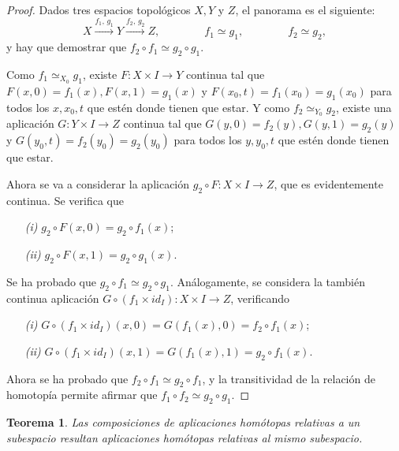 \documentclass[11pt]{report}
\newtheorem{theorem}{Teorema}[chapter]
\theoremstyle{definition}
\theoremstyle{definition}
\theoremstyle{remark}
\begin{document}
\begin{proof}
Dados tres espacios topológicos $X,Y$ y $Z$, el panorama es el siguiente:
\[X \xrightarrow{f_1, \, g_1} Y \xrightarrow{f_2, \, g_2} Z, \qquad \qquad f_1 \simeq g_1, \qquad \qquad f_2 \simeq g_2,\]
y hay que demostrar que $f_2 \circ f_1 \simeq g_2 \circ g_1$.

\vspace{2mm}

Como $f_1 \simeq_{X_0} g_1$, existe $F \colon X \times I \to Y$ continua tal que $F(x,0) = f_1(x), F(x,1) = g_1(x)$ y $F(x_0,t)=f_1(x_0)=g_1(x_0)$ para todos los $x, x_0, t$ que estén donde tienen que estar. Y como $f_2 \simeq_{Y_0} g_2$, existe una aplicación $G \colon Y \times I \to Z$ continua tal que $G(y,0) = f_2(y), G(y,1) = g_2(y)$ y $G(y_0,t)=f_2(y_0)=g_2(y_0)$ para todos los $y, y_0, t$ que estén donde tienen que estar.

\vspace{2mm}

Ahora se va a considerar la aplicación $g_2 \circ F \colon X \times I \to Z$, que es evidentemente continua. Se verifica que 
\begin{itemize}
    \item[\textit{(i)}] $g_2 \circ F (x,0) = g_2 \circ f_1 (x)$;
    \item[\textit{(ii)}] $g_2 \circ F (x,1) = g_2 \circ g_1 (x)$.
\end{itemize}

Se ha probado que $g_2 \circ f_1 \simeq g_2 \circ g_1$. Análogamente, se considera la también continua aplicación $G \circ (f_1 \times id_I) \colon X \times I \to Z$, verificando
\begin{itemize}
    \item[\textit{(i)}] $G \circ (f_1 \times id_I) (x,0) = G(f_1(x),0) = f_2 \circ f_1 (x)$;
    \item[\textit{(ii)}] $G \circ (f_1 \times id_I) (x,1) = G(f_1(x),1) = g_2 \circ f_1 (x)$.
\end{itemize}

Ahora se ha probado que $f_2 \circ f_1 \simeq g_2 \circ f_1$, y la transitividad de la relación de homotopía permite afirmar que $f_1 \circ f_2 \simeq g_2 \circ g_1$.
\end{proof}

\begin{theorem}
    Las composiciones de aplicaciones homótopas relativas a un subespacio resultan aplicaciones homótopas relativas al mismo subespacio.
\end{theorem}
\end{document}
